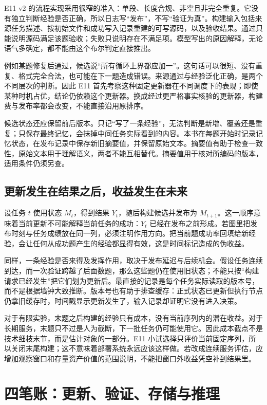 E11 v2 的流程实现采用很窄的准入：单段、长度合规、非空且非完全重复。它没有独立判断经验是否正确，所以日志写“发布”，不写“验证为真”。构建输入包括来源任务描述、按初始文件和成功写入记录重建的可写源码，以及验收结果。通过只能说明源码满足该题验收；失败只说明存在不满足项。模型写出的原因解释，无论语气多确定，都不能由这个布尔判定直接推出。

例如某题修复后通过，候选说“所有循环上界都应加一”。这句话可以很短、没有重复、格式完全合法，也可能在下一题造成错误。来源通过与经验泛化正确，是两个不同层次的判断。因此 E11 首先考察这种固定更新器在不同调度下的表现；即使某种时机占优，结论仍依赖这个更新器。换成经过更严格事实核验的更新器，构建费与发布率都会改变，不能直接沿用原排序。

候选状态还应保留前后版本。只记“写了一条经验”，无法判断是新增、覆盖还是重复；只保存最终记忆，会抹掉中间任务实际看到的内容。本书在每题开始时记录记忆状态，在发布记录中保存新旧摘要值，并保留原始文本。摘要值有助于检查一致性，原始文本用于理解语义，两者不能互相替代。摘要值用于核对所编码的版本，适用条件仍须另查。

\subsection{更新发生在结果之后，收益发生在未来}

设任务 $t$ 使用状态 $M_t$，得到结果 $Y_t$，随后构建候选并发布为 $M_{t+1}$。这一顺序意味着当前更新不可能解释当前任务的成功：$Y_t$ 已经在发布之前形成。若图里把发布时刻与任务成绩放在同一列，必须注明作用方向。把当前题成功率回填给新经验，会让任何从成功题产生的经验都显得有效，这是时间标记造成的伪收益。

同样，一条经验是否来得及发挥作用，取决于发布延迟与后续机会。假设任务连续到达，而一次验证跨越了后面数题，那么这些题仍在使用旧状态；不能只按“构建请求已经发生”把它们划为更新后。最直接的记录是每个任务实际读取的版本号，而不是根据墙钟大致推断。版本号也有助于排查缓存：正式状态已更新但执行节点仍拿旧缓存时，时间戳显示更新发生了，输入记录却证明它没有进入决策。

对于有限实验，末题之后构建的经验只有成本，没有当前序列内的潜在收益。对于长期服务，末题只不过是人为截断，下一批任务仍可能使用它。因此成本截点不是技术细枝末节，而是估计对象的一部分。E11 小试选择只评价当前固定序列，所以关闭末尾构建；这不意味着部署系统永远应该这样做。若改成连续服务评估，应增加观察窗口和存量资产价值的范围说明，不能把窗口外收益凭空补到结果里。

\section{四笔账：更新、验证、存储与推理}
\label{sec:ch13-costs}

